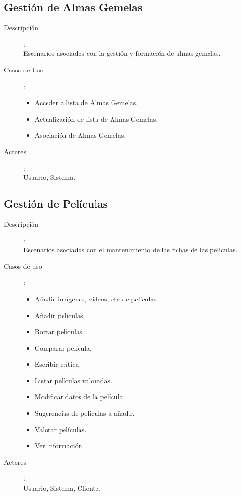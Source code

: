 \documentclass{article}
\begin{document}
\subsection*{Gestión de Almas Gemelas}
	\begin{description}
	\item[Descripción]:\\ Escenarios asociados con la gestión y formación de almas gemelas.
	\item[Casos de Uso]:
	\begin{itemize}
		\item Acceder a lista de Almas Gemelas.        %
		\item Actualización de lista de Almas Gemelas. %
		\item Asociación de Almas Gemelas.             %
	\end{itemize}		
	\item[Actores]:\\ Usuario, Sistema.
	\end{description}

\subsection*{Gestión de Películas}
	\begin{description}
	\item[Descripción]:\\ Escenarios asociados con el mantenimiento de las fichas de las películas.

	\item[Casos de uso]:
	\begin{itemize}
		\item Añadir imágenes, vídeos, etc de películas.
		\item Añadir películas. 
		\item Borrar películas. 
		\item Comparar película. %
		\item Escribir crítica.  %
		\item Listar películas valoradas.
		\item Modificar datos de la película.
		\item Sugerencias de películas a añadir.
		\item Valorar películas.
		\item Ver información.
	\end{itemize}		
	\item[Actores]:\\ Usuario, Sistema, Cliente.
	\end{description}
	
\end{document}
